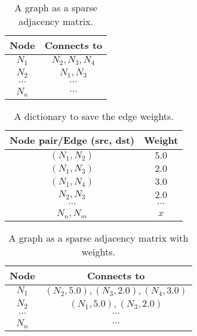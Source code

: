 
  \begin{table}[H]
    \begin{center}
      \begin{tabular}{c|c}
        Node & Connects to\\
        \hline
        $N_1$ & $N_2, N_3, N_4$\\
        $N_2$ & $N_1, N_3$\\
        $\cdots$ & $\cdots$\\
        $N_n$ & $\cdots$
      \end{tabular}

    \end{center}
    \caption{A graph as a sparse adjacency matrix.}
    \label{table:sparse_matrix_1}
  \end{table}



  \begin{table}[H]
    \begin{center}
      \begin{tabular}{c|c}
        Node pair/Edge (src, dst) & Weight\\
        \hline
        $(N_1, N_2)$ & $5.0$\\
        $(N_1, N_3)$ & $2.0$\\
        $(N_1, N_4)$ & $3.0$\\
        $N_2, N_3$ & $2.0$\\
        $\cdots$ & $\cdots$\\
        $N_n, N_m$ & $x$
      \end{tabular}

    \end{center}
    \caption{A dictionary to save the edge weights.}
    \label{table:sparse_matrix_weights}
  \end{table}



  \begin{table}[H]
    \begin{center}
      \begin{tabular}{c|c}
        Node & Connects to\\
        \hline
        $N_1$ & $(N_2, 5.0), (N_3, 2.0), (N_4, 3.0)$\\
        $N_2$ & $(N_1, 5.0), (N_3, 2.0)$\\
        $\cdots$ & $\cdots$\\
        $N_n$ & $\cdots$
      \end{tabular}

    \end{center}
    \caption{A graph as a sparse adjacency matrix with weights.}
    \label{table:sparse_matrix_2}
  \end{table}
